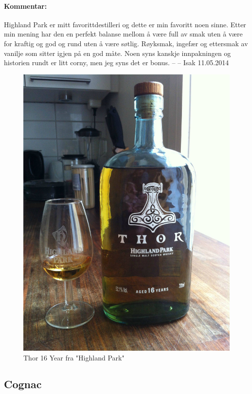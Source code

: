 \documentclass[12pt,a4paper,oneside,norsk]{article}
\begin{document}
\paragraph{Kommentar:} Highland Park er mitt favorittdestilleri og dette er min favoritt noen sinne. Etter min mening har den en perfekt balanse mellom å være full av smak uten å være for kraftig og god og rund uten å være søtlig. Røyksmak, ingefær og ettersmak av vanilje som sitter igjen på en god måte. Noen syns kanskje innpakningen og historien rundt er litt corny, men jeg syns det er bonus. 
\newline
-- -- Isak 11.05.2014

\begin{figure} [H]
\centering
\includegraphics[scale=0.1]{Bilder/Sprit/HighlandParkThor.jpg}
\caption{Thor 16 Year fra "Highland Park"}
\end{figure}     


\newpage
\subsection{Cognac}
\end{document}
